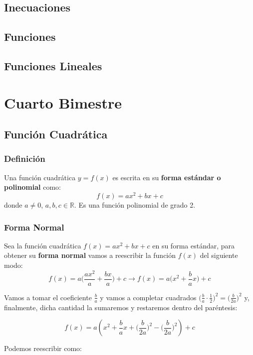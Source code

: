 \documentclass[A4paper, 10pt, oneside]{book}
\begin{document}
	\chapter{Inecuaciones}
	\chapter{Funciones}
	\chapter{Funciones Lineales}
	\part{Cuarto Bimestre}
	\chapter{Función Cuadrática}
	\section{Definición}
	\begin{tcolorbox}[colback=white]
		Una función cuadrática $y=f(x)$ es escrita en su \textbf{forma estándar o polinomial} como: $$f(x)=ax^2+bx+c$$ donde $a\neq0$, $a,b,c\in\mathbb{R}$. Es una función polinomial de grado 2.
	\end{tcolorbox}
	
	\section{Forma Normal}
	
	Sea la función cuadrática $f(x)=ax^2+bx+c$ en su forma estándar, para obtener su \textbf{forma normal}	vamos a reescribir la función $f(x)$ del siguiente modo:
	$$f(x)=a\bigg(\frac{ax^2}{a}+\frac{bx}{a}\bigg)+c \rightarrow f(x)= a\bigg(x^2+\frac{b}{a}x\bigg)+c$$
	
	Vamos a tomar el coeficiente $\displaystyle{\frac{b}{a}}$ y vamos a completar cuadrados $\displaystyle{\bigg(\frac{b}{a}\cdot\frac{1}{2}\bigg)^2 = \bigg(\frac{b}{2a}\bigg)^2}$ y, finalmente, dicha cantidad la sumaremos y restaremos  dentro del paréntesis:
	
	$$f(x)=a\left(x^2+\frac{b}{a}x+\bigg(\frac{b}{2a}\bigg)^2-\bigg(\frac{b}{2a}\bigg)^2\right)+c$$
	
	Podemos reescribir como:
	
\end{document}
